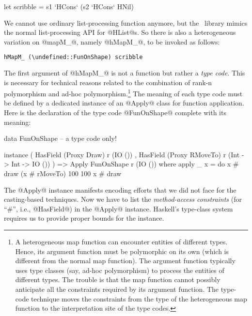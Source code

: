 \begin{code}
 let scribble = s1 `HCons` (s2 `HCons` HNil)
\end{code}

\noindent
We cannot use ordinary list-processing function anymore, but the
\HList\ library mimics the normal list-processing API for @HList@s. So
there is also a heterogeneous variation on @mapM_@, namely @hMapM_@,
to be invoked as follows:

\begin{Verbatim}[fontsize=\small,commandchars=\\\{\}]
 hMapM_ (\undefined::FunOnShape) scribble
\end{Verbatim}

\noindent
The first argument of @hMapM_@ is not a function but rather a
\emph{type code}. This is necessary for technical reasons related to
the combination of rank-n polymorphism and ad-hoc
polymorphism.\footnote{\small A heterogeneous map function can encounter
entities of different types. Hence, its argument function must be
polymorphic on its own (which is different from the normal map
function). The argument function typically uses type classes (say,
ad-hoc polymorphism) to process the entities of different types. The
trouble is that the map function cannot possibly anticipate all the
constraints required by its argument function.  The type-code
technique moves the constraints from the type of the heterogeneous map
function to the interpretation site of the type codes.} The meaning of
each type code must be defined by a dedicated instance of an @Apply@
class for function application. Here is the declaration of the type
code @FunOnShape@ complete with its meaning:

\begin{code}
 data FunOnShape -- a type code only!
\end{code}

\begin{code}
instance ( HasField (Proxy Draw) r (IO ())
         , HasField (Proxy RMoveTo) r (Int -> Int -> IO ())
         )
      => Apply FunOnShape r (IO ())
  where
    apply _ x = do
                   x # draw
                   (x # rMoveTo) 100 100
                   x # draw
\end{code}

\noindent
The @Apply@ instance manifests encoding efforts that we did not face
for the casting-based techniques. Now we have to list the
\emph{method-access constraints} (for ``\#'', i.e., @HasField@) in the
@Apply@ instance. Haskell's type-class system requires us to provide
proper bounds for the instance.

